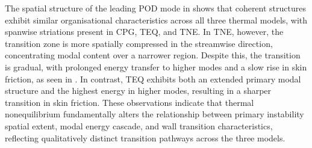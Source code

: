 The spatial structure of the leading \gls{POD} mode in  shows that coherent structures exhibit similar organisational characteristics across all three thermal models, with spanwise striations present in \gls{CPG}, \gls{TEQ}, and \gls{TNE}. In \gls{TNE}, however, the transition zone is more spatially compressed in the streamwise direction, concentrating modal content over a narrower region. Despite this, the transition is gradual, with prolonged energy transfer to higher modes and a slow rise in skin friction, as seen in . In contrast, \gls{TEQ} exhibits both an extended primary modal structure and the highest energy in higher modes, resulting in a sharper transition in skin friction. These observations indicate that thermal nonequilibrium fundamentally alters the relationship between primary instability spatial extent, modal energy cascade, and wall transition characteristics, reflecting qualitatively distinct transition pathways across the three models.





